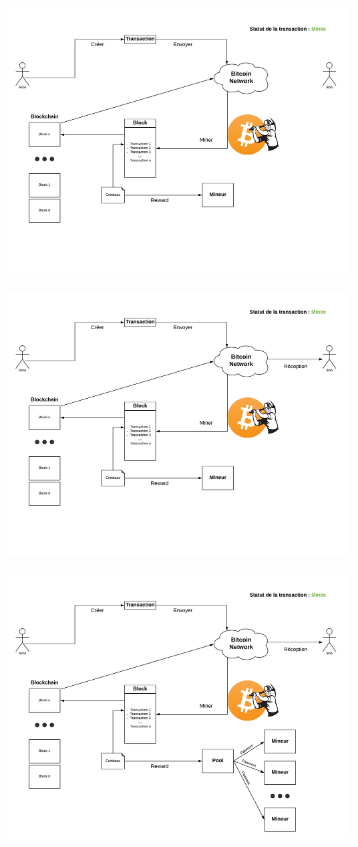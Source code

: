 \documentclass{beamer}
\begin{document}
\begin{frame}
    \begin{center}
        \includegraphics[height=7cm]{images/explanation-6.png}
    \end{center}
\end{frame}

\begin{frame}
    \begin{center}
        \includegraphics[height=7cm]{images/explanation-7.png}
    \end{center}
\end{frame}

\begin{frame}
    \begin{center}
        \includegraphics[height=7cm]{images/explanation-8.png}
    \end{center}
\end{frame}
\end{document}
